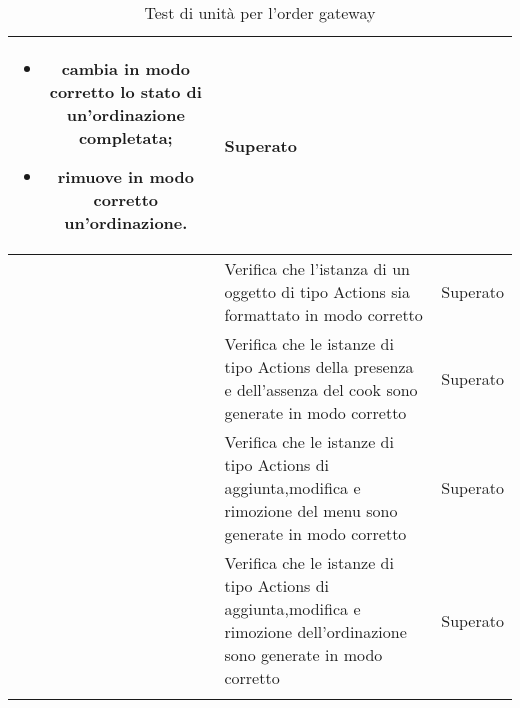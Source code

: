 \begin{longtable}{|c|P{9cm}|c|}
\begin{itemize}
		\item cambia in modo corretto lo stato di un'ordinazione completata;
		\item rimuove in modo corretto un'ordinazione.
	\end{itemize}
	& Superato \\
	\hline{} & Verifica che l'istanza di un oggetto di tipo Actions sia formattato in modo corretto & Superato \\
	\hline{} & Verifica che le istanze di tipo Actions della presenza e dell'assenza del cook sono generate in modo corretto & Superato \\
	\hline{} & Verifica che le istanze di tipo Actions di aggiunta,modifica e rimozione del menu sono generate in modo corretto & Superato \\
	\hline{} & Verifica che le istanze di tipo Actions di aggiunta,modifica e rimozione dell'ordinazione sono generate in modo corretto & Superato \\
	\hline
	\caption{Test di unità per l'order gateway}
\end{longtable}

